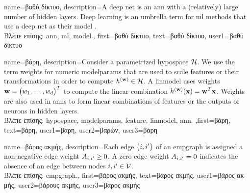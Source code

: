 {name={\foreignlanguage{greek}{βαθύ δίκτυο}},
	description={A deep net is an \gls{ann} with a (relatively) large number of 
	hidden layers. Deep learning is an umbrella term for \gls{ml} methods that use a deep 
	net as their \gls{model} \cite{Goodfellow-et-al-2016}.\\
	\foreignlanguage{greek}{Βλέπε επίσης:} \gls{ann}, \gls{ml}, \gls{model}.},
	first={\foreignlanguage{greek}{βαθύ δίκτυο}},
	text={\foreignlanguage{greek}{βαθύ δίκτυο}},
	user1={\foreignlanguage{greek}{βαθύ δίκτυο}} %
}

{name={\foreignlanguage{greek}{βάρη}},
	description={Consider a parametrized \gls{hypospace} $\mathcal{H}$. 
		We use the term weights for numeric \gls{modelparams} that are 
		used to scale \gls{feature}s or their transformations in order to compute $h^{({\bf w})} \in \mathcal{H}$. A \gls{linmodel} 
		uses weights ${\bf w}=\big(w_{1},\ldots,w_{d}\big)^{T}$ to compute 
		the linear combination $h^{({\bf w})}({\bf x})= {\bf w}^{T} {\bf x}$. 
		Weights are also used in \gls{ann}s to form linear combinations of \gls{feature}s or the 
		outputs of neurons in hidden layers.\\
		\foreignlanguage{greek}{Βλέπε επίσης:} \gls{hypospace}, \gls{modelparams}, \gls{feature}, \gls{linmodel}, \gls{ann}.
		},first={\foreignlanguage{greek}{βάρη}},
		text={\foreignlanguage{greek}{βάρη}},
		user1={\foreignlanguage{greek}{βάρη}}, %
		user2={\foreignlanguage{greek}{βαρών}}, %
		user3={\foreignlanguage{greek}{βάρη}} %
}

{name={\foreignlanguage{greek}{βάρος ακμής}},
	description={Each edge $\{i,i'\}$ of an \gls{empgraph} is 
		assigned a non-negative edge weight $A_{i,i'}\geq0$. 
		A zero edge weight $A_{i,i'}=0$ indicates the absence 
		of an edge between nodes $i, i' \in \mathcal{V}$.\\
		\foreignlanguage{greek}{Βλέπε επίσης:} \gls{empgraph}.}, 
	first={\foreignlanguage{greek}{βάρος ακμής}},
	text={\foreignlanguage{greek}{βάρος ακμής}},
	user1={\foreignlanguage{greek}{βάρος ακμής}}, %
	user2={\foreignlanguage{greek}{βάρους ακμής}}, %
	user3={\foreignlanguage{greek}{βάρος ακμής}} %
}

